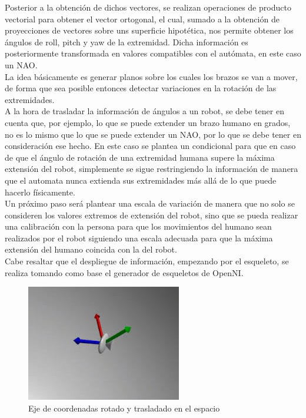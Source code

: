 \documentclass[letterpaper]{article}
\begin{document}
Posterior a la obtención de dichos vectores, se realizan operaciones de producto vectorial para obtener el vector ortogonal, el cual, sumado a la obtención de proyecciones de vectores sobre uns superficie hipotética, nos permite obtener los ángulos de roll, pitch y yaw de la extremidad. Dicha información es posteriormente transformada en valores compatibles con el autómata,  en este caso un NAO.\\

La idea básicamente es generar planos sobre los cuales los brazos se van a mover, de forma que sea posible entonces detectar variaciones en la rotación de las extremidades.\\

A la hora de trasladar la información de ángulos a un robot, se debe tener en cuenta que, por ejemplo, lo que se  puede extender un brazo humano en grados, no es lo mismo que lo que se puede extender un NAO, por lo que se debe tener en consideración ese hecho. En este caso se plantea un condicional para que en caso de que el ángulo de rotación de una extremidad humana supere la máxima extensión del robot, simplemente se sigue restringiendo la información de manera que el automata nunca extienda sus extremidades más allá de lo que puede hacerlo físicamente.\\

Un próximo paso será plantear una escala de variación de manera que no solo se consideren los valores extremos de extensión del robot, sino que se pueda realizar una calibración con la persona para que los movimientos del humano sean realizados por el robot siguiendo una escala adecuada para que la máxima extensión del humano coincida con la del robot.\\

Cabe resaltar que el despliegue de información, empezando por el esqueleto, se realiza tomando como base el generador de esqueletos de OpenNI.\\










		\begin{figure}[h!]
			\centering
			\includegraphics[width=0.55\linewidth]{imagenes/coordenadas-rotado.jpeg}
			\caption{Eje de coordenadas rotado y trasladado en el espacio}
		\end{figure}
\end{document}
